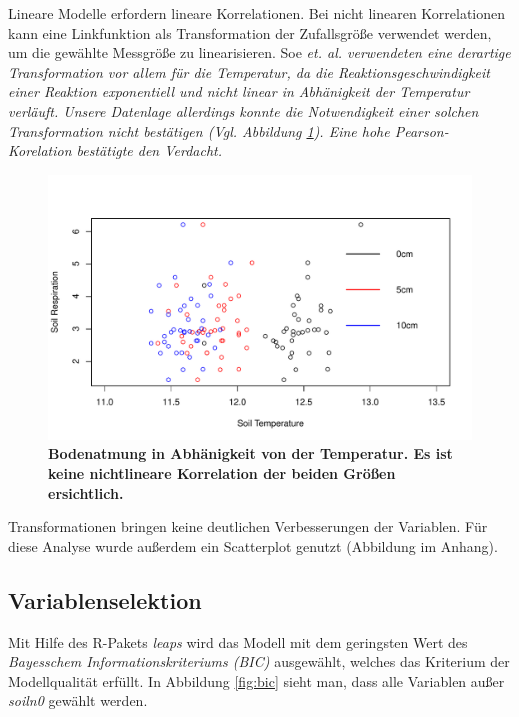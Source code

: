Lineare Modelle erfordern lineare Korrelationen.
Bei nicht linearen Korrelationen kann eine Linkfunktion als Transformation der Zufallsgröße verwendet werden, um die gewählte Messgröße zu linearisieren.
Soe \it{et. al.} verwendeten eine derartige Transformation vor allem für die Temperatur, da die Reaktionsgeschwindigkeit einer Reaktion exponentiell und nicht linear in Abhänigkeit der Temperatur verläuft.
Unsere Datenlage allerdings konnte die Notwendigkeit einer solchen Transformation nicht bestätigen (Vgl. Abbildung \ref{fig:temp}).
Eine hohe \it{Pearson}-Korelation bestätigte den Verdacht.
\begin{figure}
	\centering
	\includegraphics[width=\textwidth]{fig/model/temp-vs-resp.pdf}
	\caption{\bf{Bodenatmung in Abhänigkeit von der Temperatur.}
		 Es ist keine nichtlineare Korrelation der beiden Größen ersichtlich. }
	\label{fig:temp}
\end{figure}
Transformationen bringen keine deutlichen Verbesserungen der Variablen. 
Für diese Analyse wurde außerdem ein Scatterplot genutzt (Abbildung im Anhang).


\subsection{Variablenselektion}

Mit Hilfe des R-Pakets \emph{leaps} wird das Modell mit dem geringsten Wert des \emph{Bayesschem Informationskriteriums (BIC)} ausgewählt, welches das Kriterium der Modellqualität erfüllt.
In Abbildung \ref{fig:bic} sieht man, dass alle Variablen außer \emph{soiln0} gewählt werden. 



